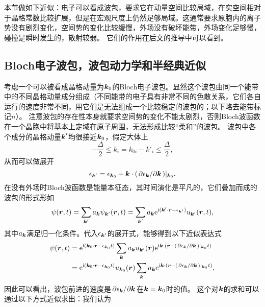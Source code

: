 本节做如下近似：电子可以看成波包，要求它在动量空间比较局域，在实空间相对于晶格常数比较扩展，但是在宏观尺度上仍然足够局域。这通常要求原胞内的离子势没有剧烈变化，空间势的变化比较缓慢，外场没有破坏能带，外场变化足够慢，碰撞是瞬时发生的，散射较弱。 
它们的作用在后文的推导中可以看到。

\subsection{Bloch电子波包，波包动力学和半经典近似}\label{sec:bloch-wave-pocket}

考虑一个可以被看成晶格动量为$\vb*{k}_0$的Bloch电子波包。显然这个波包由同一个能带中的不同晶格动量成分组成（不同能带的电子具有非常不同的色散关系，它们各自运行的速度非常不同，用它们是无法组成一个比较稳定的波包的；以下略去能带标记$n$）。
注意波包的存在性本身就要求空间势的变化不能太剧烈，否则Bloch波函数在一个晶胞中将基本上定域在原子周围，无法形成比较“柔和”的波包。
波包中各个成分的晶格动量$\vb*{k}'$均很接近$\vb*{k}_0$，假定大体上
\begin{equation}
    - \frac{\Delta}{2} \leq k_i = k_{0i} - k'_i \leq \frac{\Delta}{2},
\end{equation}
从而可以做展开
\begin{equation}
    \epsilon_{\vb*{k}'} = \epsilon_{\vb*{k}_0} + \vb*{k} \cdot (\pdv*{\epsilon_{\vb*{k}}}{\vb*{k}})|_{\vb*{k}_0}.
\end{equation}
在没有外场时Bloch波函数是能量本征态，其时间演化是平凡的，它们叠加而成的波包的形式形如
\[
    \psi(\vb*{r}, t) = \sum_{\vb*{k}'} a_{\vb*{k}} \psi_{\vb*{k}'}(\vb*{r}, t) = \sum_{\vb*{k}'} a_{\vb*{k}} \mathrm{e}^{\mathrm{i} (\vb*{k}' \cdot \vb*{r} - \epsilon_{\vb*{k}'})} u_{\vb*{k}'}(\vb*{r}, t),
\]
其中$a_{\vb*{k}}$满足归一化条件。代入$\epsilon_{\vb*{k}'}$的展开式，能够得到以下近似表达式
\[
    \begin{aligned}
        \psi(\vb*{r}, t) &= \mathrm{e}^{\mathrm{i} (\vb*{k}_0 \cdot \vb*{r} - \epsilon_{\vb*{k}_0} t)} \sum_{\vb*{k}} a_{\vb*{k}} u_{\vb*{k}'}(\vb*{r}) \mathrm{e}^{\mathrm{i} \vb*{k} \cdot (\vb*{r} - (\pdv*{\epsilon_{\vb*{k}}}{\vb*{k}}) |_{\vb*{k}_0} t)} \\
        &= \mathrm{e}^{\mathrm{i} (\vb*{k}_0 \cdot \vb*{r} - \epsilon_{\vb*{k}_0} t)} u_{\vb*{k}_0}(\vb*{r}) \sum_{\vb*{k}} a_{\vb*{k}} \mathrm{e}^{\mathrm{i} \vb*{k} \cdot (\vb*{r} - (\pdv*{\epsilon_{\vb*{k}}}{\vb*{k}}) |_{\vb*{k}_0} t)}  ,
    \end{aligned}
\]
因此可以看出，波包前进的速度是$\pdv*{\epsilon_{\vb*{k}}}{\vb*{k}}$在$\vb*{k} = \vb*{k}_0$时的值。
这个对$\vb*{k}$的求和可以通过以下方式近似求出：我们认为%

